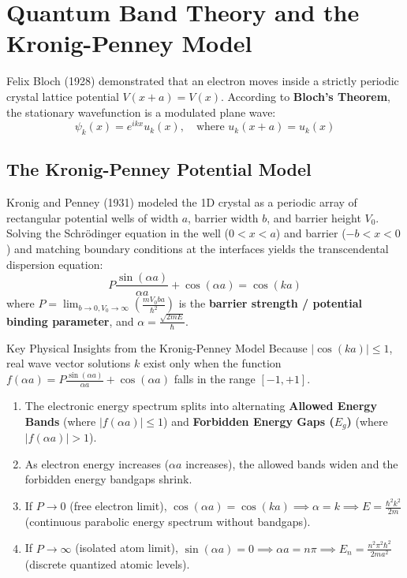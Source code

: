 \section{Quantum Band Theory and the Kronig-Penney Model}
Felix Bloch (1928) demonstrated that an electron moves inside a strictly periodic crystal lattice potential $V(x+a) = V(x)$. According to \textbf{Bloch's Theorem}, the stationary wavefunction is a modulated plane wave:
\begin{equation}
\psi_k(x) = e^{ikx} u_k(x), \quad \text{where } u_k(x+a) = u_k(x)
\end{equation}

\subsection{The Kronig-Penney Potential Model}
Kronig and Penney (1931) modeled the 1D crystal as a periodic array of rectangular potential wells of width $a$, barrier width $b$, and barrier height $V_0$.
Solving the Schrödinger equation in the well ($0 < x < a$) and barrier ($-b < x < 0$) and matching boundary conditions at the interfaces yields the transcendental dispersion equation:
\begin{equation}
P\frac{\sin(\alpha a)}{\alpha a} + \cos(\alpha a) = \cos(ka)
\end{equation}
where $P = \lim_{b \to 0, V_0 \to \infty} \left( \frac{m V_0 b a}{\hbar^2} \right)$ is the \textbf{barrier strength / potential binding parameter}, and $\alpha = \frac{\sqrt{2mE}}{\hbar}$.

\begin{conceptbox}{Key Physical Insights from the Kronig-Penney Model}
Because $|\cos(ka)| \le 1$, real wave vector solutions $k$ exist only when the function $f(\alpha a) = P\frac{\sin(\alpha a)}{\alpha a} + \cos(\alpha a)$ falls in the range $[-1, +1]$.
\begin{enumerate}[itemsep=2pt]
    \item The electronic energy spectrum splits into alternating \textbf{Allowed Energy Bands} (where $|f(\alpha a)| \le 1$) and \textbf{Forbidden Energy Gaps ($E_g$)} (where $|f(\alpha a)| > 1$).
    \item As electron energy increases ($\alpha a$ increases), the allowed bands widen and the forbidden energy bandgaps shrink.
    \item If $P \to 0$ (free electron limit), $\cos(\alpha a) = \cos(ka) \implies \alpha = k \implies E = \frac{\hbar^2 k^2}{2m}$ (continuous parabolic energy spectrum without bandgaps).
    \item If $P \to \infty$ (isolated atom limit), $\sin(\alpha a) = 0 \implies \alpha a = n\pi \implies E_n = \frac{n^2 \pi^2 \hbar^2}{2ma^2}$ (discrete quantized atomic levels).
\end{enumerate}
\end{conceptbox}

